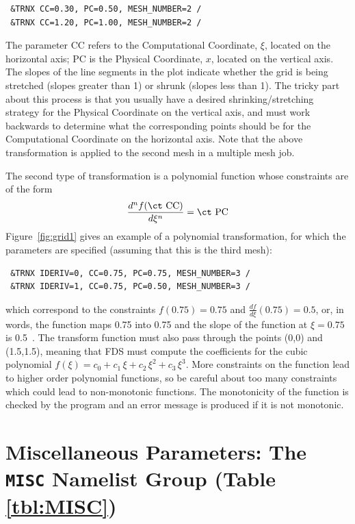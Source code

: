 \documentclass[11pt]{book}
\begin{document}
\footnotesize
\begin{verbatim}
 &TRNX CC=0.30, PC=0.50, MESH_NUMBER=2 /
 &TRNX CC=1.20, PC=1.00, MESH_NUMBER=2 /
\end{verbatim} \normalsize

\noindent
The parameter {\ct CC} refers to the Computational Coordinate, $\xi$, located
on the horizontal axis; {\ct PC} is the Physical Coordinate, $x$, located on
the vertical axis.  The slopes of the
line segments in the plot indicate whether the grid is being stretched (slopes greater
than 1) or shrunk (slopes less than 1). The tricky part about this
process is that you usually have a desired shrinking/stretching strategy
for the Physical Coordinate on the vertical axis, and must work backwards
to determine what the corresponding points should be for the Computational
Coordinate on the horizontal axis. Note that the above transformation is
applied to the second mesh in a multiple mesh job.

The second type of transformation is
a polynomial function whose constraints are of the form
$$ \frac{d^n f(\hbox{\ct CC})}{d\xi^n} = \hbox{\ct PC}   $$
Figure~\ref{fig:grid1} gives an example of a polynomial transformation, for which
the parameters are specified (assuming that this is the third mesh):

\footnotesize
\begin{verbatim}
 &TRNX IDERIV=0, CC=0.75, PC=0.75, MESH_NUMBER=3 /
 &TRNX IDERIV=1, CC=0.75, PC=0.50, MESH_NUMBER=3 /
\end{verbatim} \normalsize

\noindent
which correspond to the constraints
$f(0.75)=0.75$ and $\frac{df}{d\xi}(0.75) = 0.5$, or, in words, the
function maps 0.75 into 0.75 and the slope of the function at
$\xi=0.75$ is 0.5~.
The transform function must also pass through the points (0,0) and (1.5,1.5), meaning that
FDS must compute the coefficients for the
cubic polynomial $f(\xi) = c_0 + c_1 \, \xi + c_2 \, \xi^2 + c_3 \, \xi^3$.
More constraints on the function lead to higher order polynomial functions, so be careful about too many constraints which could lead
to non-monotonic functions.
The monotonicity of the function is checked by the
program and an error message is produced if it is not monotonic.


\clearpage
\section{Miscellaneous Parameters: The \texorpdfstring{{\tt MISC}}{MISC} Namelist Group (Table \ref{tbl:MISC})}
\label{info:MISC}
\end{document}
